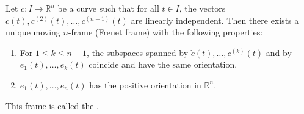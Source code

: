 Let $c: I \rightarrow \mathbb{R}^n$ be a curve such that for all $t \in I$, the vectors $\dot{c}(t), c^{(2)}(t), \ldots, c^{(n-1)}(t)$ are linearly independent. Then there exists a unique moving $n$-frame (Frenet frame) with the following properties:
\begin{enumerate}
\item For $1 \leq k \leq n-1$, the subspaces spanned by $\dot{c}(t), \ldots, c^{(k)}(t)$ and by $e_1(t), \ldots, e_k(t)$ coincide and have the same orientation.
\item $e_1(t), \ldots, e_n(t)$ has the positive orientation in $\mathbb{R}^n$.
\end{enumerate}
This frame is called the .
